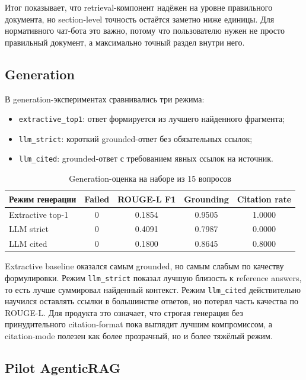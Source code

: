 \documentclass[12pt,a4paper]{article}
\begin{document}
Итог показывает, что retrieval-компонент надёжен на уровне правильного документа, но section-level точность остаётся заметно ниже единицы. Для нормативного чат-бота это важно, потому что пользователю нужен не просто правильный документ, а максимально точный раздел внутри него.

\subsection{Generation}

В generation-экспериментах сравнивались три режима:
\begin{itemize}
    \item \texttt{extractive\_top1}: ответ формируется из лучшего найденного фрагмента;
    \item \texttt{llm\_strict}: короткий grounded-ответ без обязательных ссылок;
    \item \texttt{llm\_cited}: grounded-ответ с требованием явных ссылок на источник.
\end{itemize}

\begin{table}[h]
\centering
\small
\begin{tabular}{lcccc}
\toprule
Режим генерации & Failed & ROUGE-L F1 & Grounding & Citation rate \\
\midrule
Extractive top-1 & 0 & 0.1854 & 0.9505 & 1.0000 \\
LLM strict & 0 & 0.4091 & 0.7987 & 0.0000 \\
LLM cited & 0 & 0.1800 & 0.8645 & 0.8000 \\
\bottomrule
\end{tabular}
\caption{Generation-оценка на наборе из 15 вопросов}
\end{table}

Extractive baseline оказался самым grounded, но самым слабым по качеству формулировки. Режим \texttt{llm\_strict} показал лучшую близость к reference answers, то есть лучше суммировал найденный контекст. Режим \texttt{llm\_cited} действительно научился оставлять ссылки в большинстве ответов, но потерял часть качества по ROUGE-L. Для продукта это означает, что строгая генерация без принудительного citation-format пока выглядит лучшим компромиссом, а citation-mode полезен как более прозрачный, но и более тяжёлый режим.

\subsection{Pilot AgenticRAG}
\end{document}
